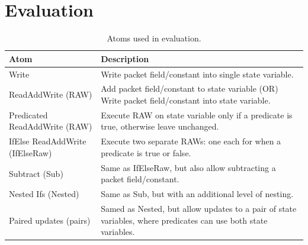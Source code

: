 \section{Evaluation}
\label{s:eval}

\begin{table}[!t]
  \begin{scriptsize}
  \begin{tabular}{|p{}|p{}|}
    \hline
    Atom & Description \\
    \hline
    Write & Write packet field/constant into single state variable. \\
    \hline
    ReadAddWrite (RAW) & Add packet field/constant to state variable (OR) Write packet field/constant into state variable. \\
    \hline
    Predicated ReadAddWrite (RAW) & Execute RAW on state variable only if a predicate is true, otherwise leave unchanged. \\
    \hline
    IfElse ReadAddWrite (IfElseRaw) & Execute two separate RAWs: one each for when a predicate is true or false.\\
    \hline
    Subtract (Sub) & Same as IfElseRaw, but also allow subtracting a packet field/constant. \\
    \hline
    Nested Ifs (Nested) & Same as Sub, but with an additional level of nesting. \\
    \hline
    Paired updates (pairs) & Samed as Nested, but allow updates to a pair of state variables, where predicates can use both state variables. \\
    \hline
  \end{tabular}
  \end{scriptsize}
  \caption{Atoms used in evaluation.}
  \label{tab:templates}
\end{table}


